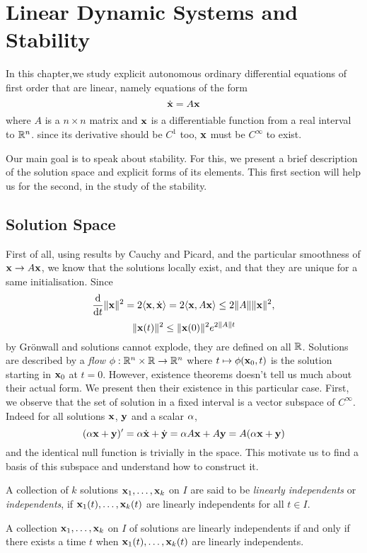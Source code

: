 \chapter{Linear Dynamic Systems and Stability}
In this chapter,we study explicit autonomous ordinary differential equations of first order that are linear, namely equations of the form 
\[\dot{\mathbf{x}}=A\mathbf{x}\]
where $A$ is a $n\times n$ matrix and $\mathbf{x}$ is a differentiable function from a real interval to $\mathbb{R}^n$. since its derivative should be $C^1$ too, $\mathbf{x}$ must be $C^\infty$ to exist.

Our main goal is to speak about stability. For this, we present a brief description of the solution space and explicit forms of its elements. This first section will help us for the second, in the study of the stability.
\section{Solution Space}
First of all, using results by Cauchy and Picard, and the particular smoothness of $\mathbf{x}\to A\mathbf{x}$, we know that the solutions locally exist, and that they are unique for a same initialisation. Since $$\frac{\mathrm{d}}{\mathrm{d} t}\|\mathbf{x}\|^2=2\langle\mathbf{x},\dot{\mathbf{x}}\rangle=2\langle\mathbf{x},A\mathbf{x}\rangle\leq 2\|A\|\|\mathbf{x}\|^2,$$ 
$$\|\mathbf{x}(t)\|^2\leq \|\mathbf{x}(0)\|^2e^{2\|A\|t} $$
by Grönwall and solutions cannot explode, they are defined on all $\mathbb{R}$. Solutions are described by a \emph{flow} $\phi:\mathbb{R}^n\times \mathbb{R}\to\mathbb{R}^n$ where $t\mapsto\phi(\mathbf{x}_0,t)$ is the solution starting in $\mathbf{x}_0$ at $t=0$. However, existence theorems doesn't tell us much about their actual form. We present then their existence in this particular case.
First, we observe that the set of solution in a fixed interval is a vector subspace of $C^\infty$. Indeed for all solutions $\mathbf{x}$, $\mathbf{y}$ and a scalar $\alpha$, \[(\alpha\mathbf{x}+\mathbf{y})'=\alpha\dot{\mathbf{x}} + \dot{\mathbf{y}}=\alpha A\mathbf{x} + A\mathbf{y}=A(\alpha\mathbf{x}+\mathbf{y})\] and the identical null function is trivially in the space. This motivate us to find a basis of this subspace and understand how to construct it.
\begin{definition}
    A collection of $k$ solutions $\mathbf{x}_1,\dots,\mathbf{x}_k$ on $I$ are said to be \emph{linearly independents} or \emph{independents}, if $\mathbf{x}_1(t),\dots,\mathbf{x}_k(t)$ are linearly independents for all $t\in I$.
\end{definition}
\begin{lemme}
A collection $\mathbf{x}_1,\dots,\mathbf{x}_k$ on $I$ of solutions are linearly independents if and only if there exists a time $t$ when $\mathbf{x}_1(t),\dots,\mathbf{x}_k(t)$ are linearly independents.
\end{lemme}
